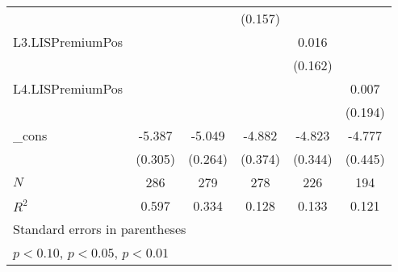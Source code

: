 {\begin{tabular}{l*{5}{c}}
          &                  &                  &  (0.157)         &                  &                  \\
L3.LISPremiumPos&                  &                  &                  &    0.016         &                  \\
          &                  &                  &                  &  (0.162)         &                  \\
L4.LISPremiumPos&                  &                  &                  &                  &    0.007         \\
          &                  &                  &                  &                  &  (0.194)         \\
\_cons    &   -5.387\sym{***}&   -5.049\sym{***}&   -4.882\sym{***}&   -4.823\sym{***}&   -4.777\sym{***}\\
          &  (0.305)         &  (0.264)         &  (0.374)         &  (0.344)         &  (0.445)         \\
\midrule
\(N\)     &      286         &      279         &      278         &      226         &      194         \\
\(R^{2}\) &    0.597         &    0.334         &    0.128         &    0.133         &    0.121         \\
\bottomrule
\multicolumn{6}{l}{\footnotesize Standard errors in parentheses}\\
\multicolumn{6}{l}{\footnotesize \sym{*} \(p<0.10\), \sym{**} \(p<0.05\), \sym{***} \(p<0.01\)}\\
\end{tabular}
}
